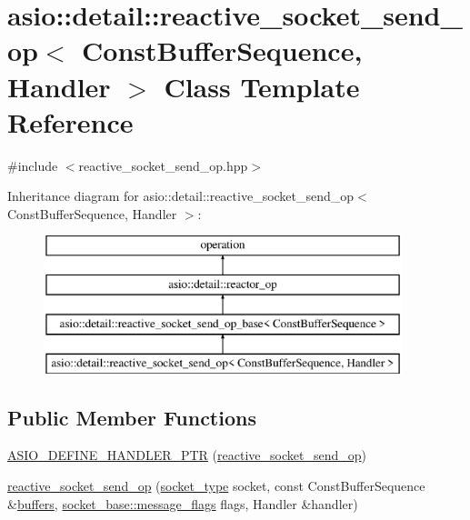 \hypertarget{classasio_1_1detail_1_1reactive__socket__send__op}{}\section{asio\+:\+:detail\+:\+:reactive\+\_\+socket\+\_\+send\+\_\+op$<$ Const\+Buffer\+Sequence, Handler $>$ Class Template Reference}
\label{classasio_1_1detail_1_1reactive__socket__send__op}


{\ttfamily \#include $<$reactive\+\_\+socket\+\_\+send\+\_\+op.\+hpp$>$}

Inheritance diagram for asio\+:\+:detail\+:\+:reactive\+\_\+socket\+\_\+send\+\_\+op$<$ Const\+Buffer\+Sequence, Handler $>$\+:\begin{figure}[H]
\begin{center}
\leavevmode
\includegraphics[height=4.000000cm]{classasio_1_1detail_1_1reactive__socket__send__op}
\end{center}
\end{figure}
\subsection*{Public Member Functions}
\begin{DoxyCompactItemize}
\item 
\hyperlink{classasio_1_1detail_1_1reactive__socket__send__op_a827650385f6226ad7084f2dfa1828d00}{A\+S\+I\+O\+\_\+\+D\+E\+F\+I\+N\+E\+\_\+\+H\+A\+N\+D\+L\+E\+R\+\_\+\+P\+T\+R} (\hyperlink{classasio_1_1detail_1_1reactive__socket__send__op}{reactive\+\_\+socket\+\_\+send\+\_\+op})
\item 
\hyperlink{classasio_1_1detail_1_1reactive__socket__send__op_a1b0741219b5a6c6158d87bcf69cc2984}{reactive\+\_\+socket\+\_\+send\+\_\+op} (\hyperlink{namespaceasio_1_1detail_a6798c771dd84b79798b1a08150706ea9}{socket\+\_\+type} socket, const Const\+Buffer\+Sequence \&\hyperlink{group__async__read_ga54dede45c3175148a77fe6635222c47d}{buffers}, \hyperlink{classasio_1_1socket__base_ac3cf77465dfedfe1979b5415cf32cc94}{socket\+\_\+base\+::message\+\_\+flags} flags, Handler \&handler)
\end{DoxyCompactItemize}

